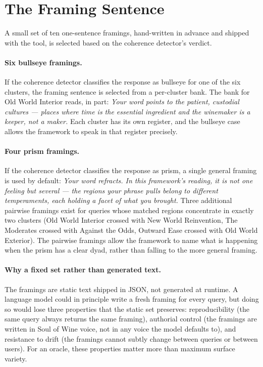 \documentclass[11pt]{article}
\begin{document}
\section{The Framing Sentence}

A small set of ten one-sentence framings, hand-written in advance and shipped with the tool, is selected based on the coherence detector's verdict.

\paragraph{Six bullseye framings.}
If the coherence detector classifies the response as bullseye for one of the six clusters, the framing sentence is selected from a per-cluster bank. The bank for Old World Interior reads, in part: \emph{Your word points to the patient, custodial cultures --- places where time is the essential ingredient and the winemaker is a keeper, not a maker.} Each cluster has its own register, and the bullseye case allows the framework to speak in that register precisely.

\paragraph{Four prism framings.}
If the coherence detector classifies the response as prism, a single general framing is used by default: \emph{Your word refracts. In this framework's reading, it is not one feeling but several --- the regions your phrase pulls belong to different temperaments, each holding a facet of what you brought.} Three additional pairwise framings exist for queries whose matched regions concentrate in exactly two clusters (Old World Interior crossed with New World Reinvention, The Moderates crossed with Against the Odds, Outward Ease crossed with Old World Exterior). The pairwise framings allow the framework to name what is happening when the prism has a clear dyad, rather than falling to the more general framing.

\paragraph{Why a fixed set rather than generated text.}
The framings are static text shipped in JSON, not generated at runtime. A language model could in principle write a fresh framing for every query, but doing so would lose three properties that the static set preserves: reproducibility (the same query always returns the same framing), authorial control (the framings are written in Soul of Wine voice, not in any voice the model defaults to), and resistance to drift (the framings cannot subtly change between queries or between users). For an oracle, these properties matter more than maximum surface variety.
\end{document}
